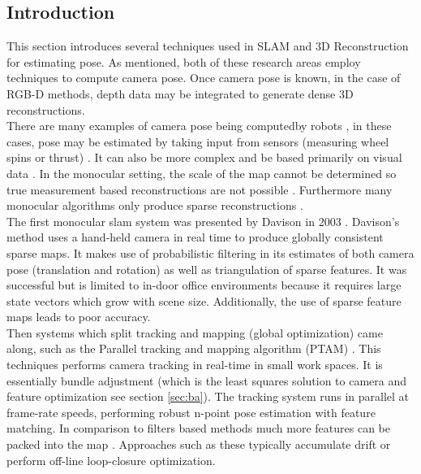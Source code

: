 \subsection{Introduction}

This section introduces several techniques used in SLAM and 3D Reconstruction for estimating pose. As mentioned, both of these research areas employ techniques to compute camera pose. Once camera pose is known, in the case of RGB-D methods, depth data may be integrated to generate dense 3D reconstructions. \\

There are many examples of camera pose being computedby robots \cite{Olson06Fast,Frese05Multilevel,Dellaert06Square,Thrun02Robotic,Nuchter056d,Grisetti07Efficient,Kaess08Isam}, in these cases, pose may be estimated by taking input from sensors (measuring wheel spins or thrust) \cite{Callieri04Roboscan}. It can also be more complex and be based primarily on visual data \cite{Davison03Real,Klein07Parallel,Strasdat10Real,Jin00Real,Nister05Preemptive}. In the monocular setting, the scale of the map cannot be determined so true measurement based reconstructions are not possible \cite{Endres12Evaluation,Konolige08Outdoor, Paz08Large}. Furthermore many monocular algorithms only produce sparse reconstructions \cite{Davison03Real,Klein07Parallel}.  \\

The first monocular slam system was presented by Davison in 2003 \cite{Davison03Real}. Davison's method uses a hand-held camera in real time to produce globally consistent sparse maps. It makes use of probabilistic filtering in its estimates of both camera pose (translation and rotation) as well as triangulation of sparse features. It was successful but is limited to in-door office environments because it requires large state vectors which grow with scene size. Additionally, the use of sparse feature maps leads to poor accuracy. \\

Then systems which split tracking and mapping (global optimization) came along, such as the Parallel tracking and mapping algorithm (PTAM) \cite{Klein07Parallel}. This techniques performs camera tracking in real-time in small work spaces. It is essentially bundle adjustment (which is the least squares solution to camera and feature optimization see section \ref{sec:ba}). The tracking system runs in parallel at frame-rate speeds, performing robust n-point pose estimation with feature matching. In comparison to filters based methods much more features can be packed into the map \cite{Strasdat10Real}. Approaches such as these typically accumulate drift \cite{Beardsley97Sequential} or perform off-line loop-closure optimization. \\

